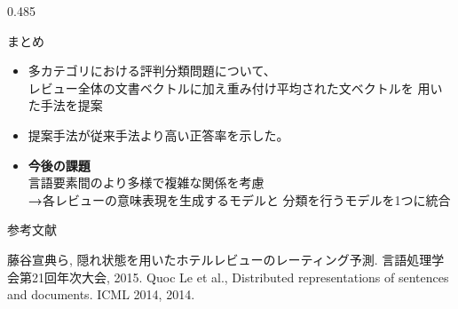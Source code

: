 \documentclass[unicode,10pt]{beamer}
\newcommand{\columnsize}{0.485\textwidth}
\newcommand{\arrow}{\textcolor{ttiblue}{\textbf{→}}\hspace{1ex}}
\newcommand{\itemtitle}[1]{\textbf{#1}\\}
\begin{document}
\begin{frame}
\begin{columns}[onlytextwidth,t]
\begin{column}{\columnsize}
  \begin{block}{まとめ}
    \begin{itemize}
      \item 多カテゴリにおける評判分類問題について、\\
            レビュー全体の文書ベクトルに加え重み付け平均された文ベクトルを
            用いた手法を提案
      \item 提案手法が従来手法\cite{fujitani15}より高い正答率を示した。
      \item \itemtitle{今後の課題}
            言語要素間のより多様で複雑な関係を考慮 \\
            \arrow 各レビューの意味表現を生成するモデルと
                   分類を行うモデルを1つに統合 \\
    \end{itemize}
  \end{block}

  参考文献
  
  \begin{thebibliography}{9}
    藤谷宣典ら,
    隠れ状態を用いたホテルレビューのレーティング予測.
    言語処理学会第21回年次大会, 2015.
    Quoc Le et al.,
    Distributed representations of sentences and documents.
    ICML 2014, 2014.
  \end{thebibliography}
\end{column}

\end{columns}
\end{frame}
\end{document}
